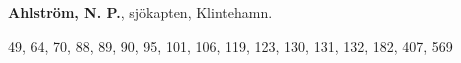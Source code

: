 \textbf{Ahlström, N. P.}, sjökapten, Klintehamn. 

49, 64, 70, 88, 89, 90, 95, 101, 106, 119, 123, 130, 131, 132, 182, 407, 569 
